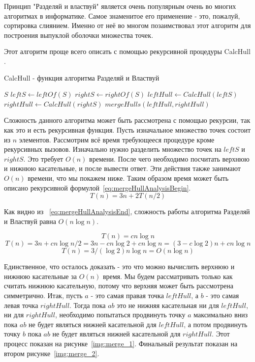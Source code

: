 Принцип "Разделяй и властвуй" является очень популярным очень во многих алгоритмах в информатике. Самое знаменитое его применение - это, пожалуй, сортировка слиянием. Именно от неё во многом позаимствовал этот алгоритм для построения выпуклой оболочки множества точек.

Этот алгоритм проще всего описать с помощью рекурсивной процедуры CalcHull \cite{mount2000lecture}.

\begin{algorithm}[H]
	\caption{CalcHull - функция алгоритма Разделяй и Властвуй}
	\begin{algorithmic}[1]
			\Return $S$
		\EndIf
		\State $leftS\gets leftOf(S)$ 
		\State $rightS\gets rightOf(S)$ 
		\State $leftHull\gets CalcHull(leftS)$
		\State $rightHull\gets CalcHull(rightS)$
		\State
		\Return $mergeHulls(leftHull, rightHull)$
		\EndProcedure
	\end{algorithmic}
\end{algorithm}

Сложность данного алгоритма может быть рассмотрена с помощью рекурсии, так как это и есть рекурсивная функция. Пусть изначальное множество точек состоит из $n$ элементов. Рассмотрим всё время требующееся процедуре кроме рекурсивных вызовов. Изначально нужно разделить множество точек на $leftS$ и $rightS$. Это требует $O(n)$ времени. После чего необходимо посчитать верхнюю и нижнюю касательные, и после вывести ответ. Эти действия также занимают $O(n)$ времени, что мы покажем ниже. Таким образом время может быть описано рекурсивной формулой~\ref{eq:mergeHullAnalysisBegin}.
\begin{equation}\label{eq:mergeHullAnalysisBegin}
T(n) = 3n + 2T(n/2)
\end{equation}

Как видно из ~\ref{eq:mergeHullAnalysisEnd}, сложность работы алгоритма Разделяй и Властвуй равна $O(n \log n)$.

\[
T(n) = cn \log n
\]
\[
T(n) = 3n + cn \log n/2 = 3n - cn \log 2 + cn \log n = (3 - c \log 2)n + cn \log n
\]
\begin{equation}\label{eq:mergeHullAnalysisEnd}
T(n) = 3/(\log 2)n \log n = O(n \log n)
\end{equation}

Единственное, что осталось доказать - это что можно вычислить верхнюю и нижнюю касательные за $O(n)$ время. Мы будем рассматривать только как считать нижнюю касательную, потому что верхняя может быть рассмотрена симметрично. Итак, пусть $a$ - это самая правая точка $leftHull$, а $b$ - это самая левая точка $rightHull$. Тогда пока $ab$ это не нижняя касательная ни для $leftHull$, ни для $rightHull$, необходимо попытаться продвинуть точку $a$ максимально вниз пока $ab$ не будет являться нижней касательной для $leftHull$, а потом продвинуть точку $b$ пока $ab$ не будет являться нижней касательной для $rightHull$. Этот процесс показан на рисунке~\ref{img:merge_1}. Финальный результат показан на втором рисунке~\ref{img:merge_2}.

